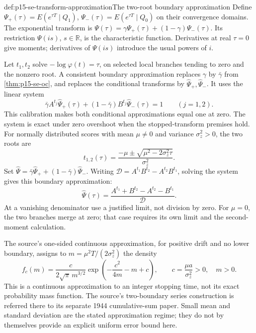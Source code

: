 \begin{hbmethod}{def:p15-se-transform-approximation}{The two-root boundary approximation}
Define \(\Psi_+(\tau)=E(e^{\tau T}\mid Q_1)\),
\(\Psi_-(\tau)=E(e^{\tau T}\mid Q_0)\) on their convergence
domains. The exponential transform is
\(\Psi(\tau)=\gamma\Psi_+(\tau)+(1-\gamma)\Psi_-(\tau)\).
Its restriction \(\Psi(is)\), \(s\in\mathbb R\), is the
characteristic function. Derivatives at real \(\tau=0\) give moments;
derivatives of \(\Psi(is)\) introduce the usual powers of \(i\).

Let \(t_1,t_2\) solve \(-\log\varphi(t)=\tau\), on selected local
branches tending to zero and the nonzero root. A consistent boundary
approximation replaces \(\gamma\) by \(\bar\gamma\) from
\cref{thm:p15-se-oc}, and replaces the conditional transforms by
\(\widehat\Psi_+,\widehat\Psi_-\). It uses the linear system
\[
 \bar\gamma A^{t_j}\widehat\Psi_+(\tau)
 +(1-\bar\gamma)B^{t_j}\widehat\Psi_-(\tau)=1\qquad(j=1,2).
\]
This calibration makes both conditional approximations equal one at
zero. The system is exact under zero overshoot when the stopped-transform
premises hold. For normally distributed scores with mean \(\mu\ne0\) and
variance \(\sigma_z^2>0\), the two roots are
\[
 t_{1,2}(\tau)=\frac{-\mu\mathbin\pm
                     \sqrt{\mu^2-2\sigma_z^2\tau}}{\sigma_z^2}.
\]
Set \(\widehat\Psi=\bar\gamma\widehat\Psi_+
 +(1-\bar\gamma)\widehat\Psi_-\).
Writing \(\mathcal D=A^{t_1}B^{t_2}-A^{t_2}B^{t_1}\), solving
the system gives this boundary approximation:
\[
 \widehat\Psi(\tau)=
 \frac{A^{t_1}+B^{t_2}-A^{t_2}-B^{t_1}}{\mathcal D}.
\]
At a vanishing denominator use a justified limit, not division by zero.
For \(\mu=0\), the two branches merge at zero; that case requires its
own limit and the second-moment calculation.

The source's one-sided continuous approximation, for positive drift
and no lower boundary, assigns to
\(m=\mu^2T/(2\sigma_z^2)\) the density
\[
 f_c(m)=\frac{c}{2\sqrt\pi\,m^{3/2}}
        \exp\left(-\frac{c^2}{4m}-m+c\right),\qquad
 c=\frac{\mu a}{\sigma_z^2}>0,\quad m>0.
\]
This is a continuous approximation to an integer stopping time, not its
exact probability mass function. The source's two-boundary series
construction is referred there to its separate 1944 cumulative-sum paper.
Small mean and standard deviation are the stated approximation regime;
they do not by themselves provide an explicit uniform error bound here.
\cite[Equations (4.36)--(4.52), pp.~148--151]{Wald1945SequentialTests}
\end{hbmethod}

